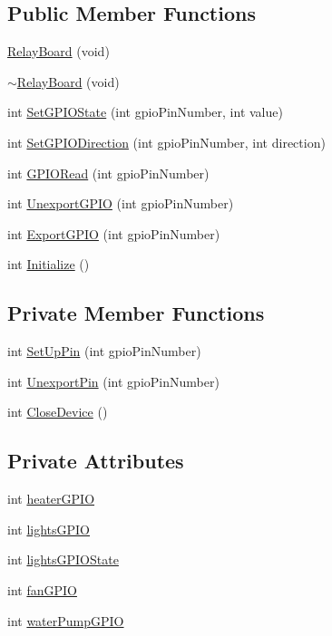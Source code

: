 \subsection*{Public Member Functions}
\begin{DoxyCompactItemize}
\item 
\hyperlink{classRelayBoard_aa788c15cfc95188f5935f9d9d9fe86d2}{Relay\+Board} (void)
\item 
\hyperlink{classRelayBoard_af05bb34a287c76312104a427c86c658e}{$\sim$\+Relay\+Board} (void)
\item 
int \hyperlink{classRelayBoard_a161657ba51adff983bae66543ff5d365}{Set\+G\+P\+I\+O\+State} (int gpio\+Pin\+Number, int value)
\item 
int \hyperlink{classRelayBoard_a1011a5d79df5912e20d11053d7811ecd}{Set\+G\+P\+I\+O\+Direction} (int gpio\+Pin\+Number, int direction)
\item 
int \hyperlink{classRelayBoard_aced41245b932daad1709cc8d3b07bc4b}{G\+P\+I\+O\+Read} (int gpio\+Pin\+Number)
\item 
int \hyperlink{classRelayBoard_a501dbfa2878a57538eff31b16e70d74d}{Unexport\+G\+P\+IO} (int gpio\+Pin\+Number)
\item 
int \hyperlink{classRelayBoard_aa5394e9044c4271f9dcd9f08b9310b5b}{Export\+G\+P\+IO} (int gpio\+Pin\+Number)
\item 
int \hyperlink{classRelayBoard_a49759cb3cdcb6c2ccd7fbb44eb34b260}{Initialize} ()
\end{DoxyCompactItemize}
\subsection*{Private Member Functions}
\begin{DoxyCompactItemize}
\item 
int \hyperlink{classRelayBoard_a11b26e90f7a0831003a002937d28b30b}{Set\+Up\+Pin} (int gpio\+Pin\+Number)
\item 
int \hyperlink{classRelayBoard_aa63dcc275551dd06476c03d68a059228}{Unexport\+Pin} (int gpio\+Pin\+Number)
\item 
int \hyperlink{classRelayBoard_a83e2f4e38c382c0bf4a56d04640cfc27}{Close\+Device} ()
\end{DoxyCompactItemize}
\subsection*{Private Attributes}
\begin{DoxyCompactItemize}
\item 
int \hyperlink{classRelayBoard_a714832d9e7129960e0413b5618d2e310}{heater\+G\+P\+IO}
\item 
int \hyperlink{classRelayBoard_a05f68a6555288127a238e31282886ae0}{lights\+G\+P\+IO}
\item 
int \hyperlink{classRelayBoard_a0b33569569f2698b99a17e65f6dbc5a1}{lights\+G\+P\+I\+O\+State}
\item 
int \hyperlink{classRelayBoard_a70ab1391ffac8f4c01c64ba1a811b6fc}{fan\+G\+P\+IO}
\item 
int \hyperlink{classRelayBoard_a195c50d455165712f59cd39c6f7a6b82}{water\+Pump\+G\+P\+IO}
\end{DoxyCompactItemize}


